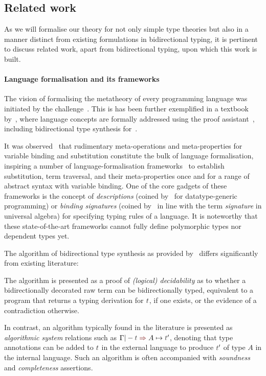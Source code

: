 \subsection{Related work}
As we will formalise our theory for not only simple type theories but also in a manner distinct from existing formulations in bidirectional typing, it is pertinent to discuss related work, apart from bidirectional typing, upon which this work is built.

\paragraph{Language formalisation and its frameworks}
The vision of formalising the metatheory of every programming language was initiated by the \PoplMark challenge~\citep{Aydemir2005}.
This is has been further exemplified in a textbook by~\citet{Wadler2022}, where language concepts are formally addressed using the proof assistant~\Agda, including bidirectional type synthesis for~\PCF.

It was observed~\citep{Altenkirch1993} that rudimentary meta-operations and meta-properties for variable binding and substitution constitute the bulk of language formalisation, inspiring a number of language-formalisation frameworks~\citep{Ahrens2018,Fiore2022,Gheri2020,Ahrens2022,Allais2021} to establish substitution, term traversal, and their meta-properties once and for a range of abstract syntax with variable binding.
One of the core gadgets of these frameworks is the concept of \emph{descriptions} (coined by~\citet{Chapman2010} for datatype-generic programming) or \emph{binding signatures} (coined by~\citet{Aczel1978} in line with the term \emph{signature} in universal algebra) for specifying typing rules of a language.
It is noteworthy that these state-of-the-art frameworks cannot fully define polymorphic types nor dependent types yet.

\begin{remark}\label{re:type-synthesis-as-decidability-proof}
The algorithm of bidirectional type synthesis as provided by~\citeauthor{Wadler2022} differs significantly from existing literature:
\begin{enumerate*}
  \item The algorithm is presented as a proof of \emph{(logical) decidability} as to whether a bidirectionally decorated raw term can be bidirectionally typed, equivalent to a program that returns a typing derivation for $\isTerm{t}$, if one exists, or the evidence of a contradiction otherwise.
  \item In contrast, an algorithm typically found in the literature is presented as \emph{algorithmic system} relations such as $\Gamma |- \isTerm{t} \syn A \mapsto \isTerm{t}'$, denoting that type annotations can be added to $\isTerm{t}$ in the external language to produce $\isTerm{t}'$ of type $A$ in the internal language.
    Such an algorithm is often accompanied with \emph{soundness} and \emph{completeness} assertions.
\end{enumerate*}
\end{remark}


